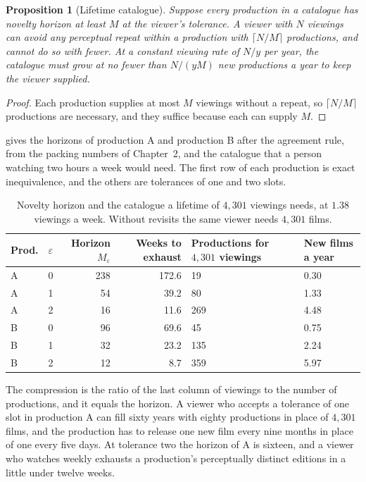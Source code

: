 \documentclass[11pt,twoside,openright]{book}
\theoremstyle{plain}
\newtheorem{proposition}[theorem]{Proposition}
\theoremstyle{definition}
\theoremstyle{remark}
\begin{document}
\begin{proposition}[Lifetime catalogue]\label{prop:life}
Suppose every production in a catalogue has novelty horizon at least $M$ at the viewer's tolerance. A viewer with $N$ viewings can avoid any perceptual repeat within a production with $\lceil N/M\rceil$ productions, and cannot do so with fewer. At a constant viewing rate of $N/y$ per year, the catalogue must grow at no fewer than $N/(yM)$ new productions a year to keep the viewer supplied.
\end{proposition}

\begin{proof}
Each production supplies at most $M$ viewings without a repeat, so $\lceil N/M\rceil$ productions are necessary, and they suffice because each can supply $M$.
\end{proof}

 gives the horizons of production A and production B after the agreement rule, from the packing numbers of Chapter~2, and the catalogue that a person watching two hours a week would need. The first row of each production is exact inequivalence, and the others are tolerances of one and two slots.

\begin{table}[ht]
\centering
\begin{tabular}{@{}llrrp{2.6cm}p{1.6cm}@{}}
\toprule
Prod. & $\varepsilon$ & Horizon $M_\varepsilon$ & Weeks to exhaust & Productions for $4{,}301$ viewings & New films a year\\
\midrule
A & 0 & 238 & 172.6 & 19 & 0.30\\
A & 1 & 54 & 39.2 & 80 & 1.33\\
A & 2 & 16 & 11.6 & 269 & 4.48\\
B & 0 & 96 & 69.6 & 45 & 0.75\\
B & 1 & 32 & 23.2 & 135 & 2.24\\
B & 2 & 12 & 8.7 & 359 & 5.97\\
\bottomrule
\end{tabular}
\caption{Novelty horizon and the catalogue a lifetime of $4{,}301$ viewings needs, at $1.38$ viewings a week. Without revisits the same viewer needs $4{,}301$ films.}\label{tab:horizon13}
\end{table}

The compression is the ratio of the last column of viewings to the number of productions, and it equals the horizon. A viewer who accepts a tolerance of one slot in production A can fill sixty years with eighty productions in place of $4{,}301$ films, and the production has to release one new film every nine months in place of one every five days. At tolerance two the horizon of A is sixteen, and a viewer who watches weekly exhausts a production's perceptually distinct editions in a little under twelve weeks.
\end{document}
